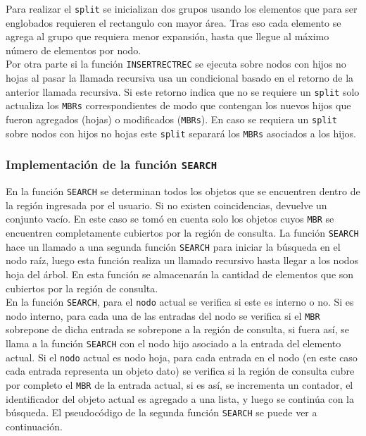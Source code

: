 \documentclass[a4paper]{article}
\begin{document}
Para realizar el \texttt{split} se inicializan dos grupos usando los elementos que para ser englobados requieren el rectangulo con mayor área. Tras eso cada elemento se agrega al grupo que requiera menor expansión, hasta que llegue al máximo número de elementos por nodo.\\

Por otra parte si la función \texttt{INSERTRECTREC} se ejecuta sobre nodos con hijos no hojas al pasar la llamada recursiva usa un condicional basado en el retorno de la anterior llamada recursiva. Si este retorno indica que no se requiere un \texttt{split} solo actualiza los \texttt{MBRs} correspondientes de modo que contengan los nuevos hijos que fueron agregados (hojas) o modificados (\texttt{MBRs}). En caso se requiera un \texttt{split} sobre nodos con hijos no hojas este \texttt{split} separará los \texttt{MBRs} asociados a los hijos.

\subsubsection{Implementación de la función  \texttt{SEARCH}} %
En la función \texttt{SEARCH} se determinan todos los objetos que se encuentren dentro de la región ingresada por el usuario. Si no existen coincidencias, devuelve un conjunto vacío. En este caso se tomó en cuenta solo los objetos cuyos \texttt{MBR} se encuentren completamente cubiertos por la región de consulta. La función  \texttt{SEARCH} hace un llamado a una segunda función  \texttt{SEARCH} para iniciar la búsqueda en el nodo raíz, luego esta función realiza un llamado recursivo hasta llegar a los nodos hoja del árbol. En esta función se almacenarán la cantidad de elementos que son cubiertos por la región de consulta.\\

En la función \texttt{SEARCH}, para el \texttt{nodo} actual se verifica si este es interno o no. Si es nodo interno, para cada una de las entradas del nodo se verifica si el \texttt{MBR} sobrepone de dicha entrada se sobrepone a la región de consulta, si fuera así, se llama a la función \texttt{SEARCH} con el nodo hijo asociado a la entrada del elemento actual.
Si el \texttt{nodo} actual es nodo hoja, para cada entrada en el nodo (en este caso cada entrada representa un objeto dato) se verifica si la región de consulta cubre por completo el \texttt{MBR} de la entrada actual, si es así, se incrementa un contador, el identificador del objeto actual es agregado a una lista, y luego se continúa con la búsqueda. El pseudocódigo de la segunda función \texttt{SEARCH} se puede ver a continuación.\\
\end{document}
